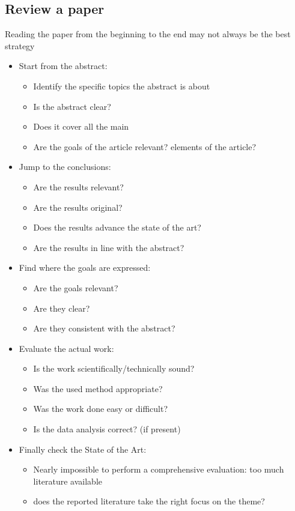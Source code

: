\documentclass{article}
\begin{document}
\subsection{Review a paper}
Reading the paper from the beginning to the end may not always be the best strategy
\begin{itemize}
\item Start from the abstract:
	\begin{itemize}
	\item Identify the specific topics the abstract is about
	\item Is the abstract clear?
	\item Does it cover all the main
	\item Are the goals of the article relevant? elements of the article?
	\end{itemize}
\item Jump to the conclusions:
	\begin{itemize}
	\item Are the results relevant?
	\item Are the results original?
	\item Does the results advance the state of the art?
	\item Are the results in line with the abstract?
	\end{itemize}
\item Find where the goals are expressed:
	\begin{itemize}
	\item Are the goals relevant?
	\item Are they clear?
	\item Are they consistent with the abstract?
	\end{itemize}
\item Evaluate the actual work:
	\begin{itemize}
	\item Is the work scientifically/technically sound?
	\item Was the used method appropriate?
	\item Was the work done easy or difficult?
	\item Is the data analysis correct? (if present)
	\end{itemize}
\item Finally check the State of the Art:
	\begin{itemize}
	\item Nearly impossible to perform a comprehensive evaluation: too much literature available
	\item does the reported literature take the right focus on the theme?

\end{itemize}
\end{itemize}
\end{document}
